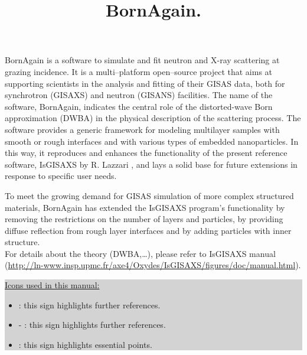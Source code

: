 \documentclass[a4paper,10pt]{report}
\title{BornAgain. }
\author{}
\newcommand\BackgroundPic{%
\put(0,0){%
\parbox[b][\paperheight]{\paperwidth}{%
\vfill
\centering
\texttt{[image: results2\_2.png]}%
\vfill
}}}
\begin{document}
\maketitle



\tableofcontents
\lstlistoflistings
\listoffigures
\listoftables

\newpage

BornAgain is a  software to simulate and fit neutron and X-ray
scattering at grazing incidence. It is a multi–platform open–source project that aims at supporting scientists in the analysis and fitting
of their GISAS data, both for synchrotron (GISAXS) and neutron (GISANS) facilities. The name of the software,
BornAgain, indicates the central role of the distorted-wave Born
approximation (DWBA) in the physical description of the
scattering process. The software provides a generic framework for modeling multilayer samples with smooth or
rough interfaces and with various types of embedded nanoparticles. In this way, it reproduces and enhances the
functionality of the present reference software, IsGISAXS by
R. Lazzari \cite{Lazzari:vi0158}, and lays a solid base for future
extensions in response to specific user needs. 

To meet the growing demand for GISAS simulation of more
complex structured materials, BornAgain has extended the IsGISAXS program’s functionality by removing the
restrictions on the number of layers and particles, by providing diffuse reflection from rough layer interfaces and
by adding particles with inner structure. \\


For details about the theory (DWBA,\ldots), please refer to IsGISAXS manual (\url{http://ln-www.insp.upmc.fr/axe4/Oxydes/IsGISAXS/figures/doc/manual.html}).\\


\colorbox{Lightgray}{\parbox{\linewidth-8\fboxsep}
{\noindent \underline{Icons used in this manual:}
\begin{itemize}
\item[] \smallpencil: this sign highlights further references.
\item[] {\huge{}} - \smallpencil \textbf{\smallpencil}: this sign highlights further references.
\item[] {\huge\danger}: this sign highlights essential points.
\end{itemize}}}
\end{document}
